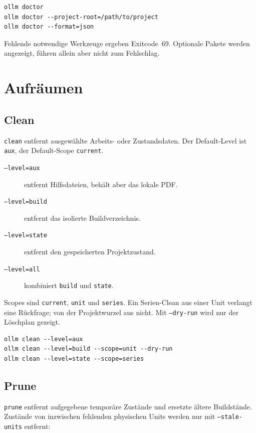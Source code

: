 \documentclass[
load-preamble+
]{osgdoc}
\begin{document}
\begin{verbatim}
ollm doctor
ollm doctor --project-root=/path/to/project
ollm doctor --format=json
\end{verbatim}

Fehlende notwendige Werkzeuge ergeben Exitcode~69. Optionale Pakete werden
angezeigt, führen allein aber nicht zum Fehlschlag.

\section{Aufräumen}

\subsection{Clean}

\texttt{clean} entfernt ausgewählte Arbeits- oder Zustandsdaten. Der
Default-Level ist \texttt{aux}, der Default-Scope \texttt{current}.

\begin{description}
\item[\texttt{--level=aux}] entfernt Hilfsdateien, behält aber das lokale PDF.
\item[\texttt{--level=build}] entfernt das isolierte Buildverzeichnis.
\item[\texttt{--level=state}] entfernt den gespeicherten Projektzustand.
\item[\texttt{--level=all}] kombiniert \texttt{build} und \texttt{state}.
\end{description}

Scopes sind \texttt{current}, \texttt{unit} und \texttt{series}. Ein
Serien-Clean aus einer Unit verlangt eine Rückfrage; von der Projektwurzel aus
nicht. Mit \texttt{--dry-run} wird nur der Löschplan gezeigt.

\begin{verbatim}
ollm clean --level=aux
ollm clean --level=build --scope=unit --dry-run
ollm clean --level=state --scope=series
\end{verbatim}

\subsection{Prune}

\texttt{prune} entfernt aufgegebene temporäre Zustände und ersetzte ältere
Buildstände. Zustände von inzwischen fehlenden physischen Units werden nur
mit \texttt{--stale-units} entfernt:
\end{document}
